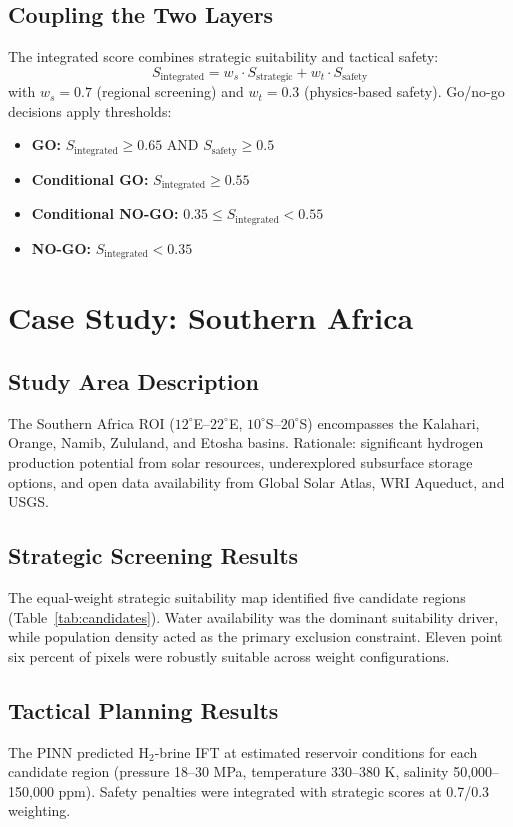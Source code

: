 \documentclass[11pt]{article}
\begin{document}
\subsection{Coupling the Two Layers}
The integrated score combines strategic suitability and tactical safety:
\begin{equation}
S_{\text{integrated}} = w_s \cdot S_{\text{strategic}} + w_t \cdot S_{\text{safety}}
\end{equation}
with $w_s = 0.7$ (regional screening) and $w_t = 0.3$ (physics-based safety). Go/no-go decisions apply thresholds:
\begin{itemize}
    \item \textbf{GO:} $S_{\text{integrated}} \geq 0.65$ AND $S_{\text{safety}} \geq 0.5$
    \item \textbf{Conditional GO:} $S_{\text{integrated}} \geq 0.55$
    \item \textbf{Conditional NO-GO:} $0.35 \leq S_{\text{integrated}} < 0.55$
    \item \textbf{NO-GO:} $S_{\text{integrated}} < 0.35$
\end{itemize}

\section{Case Study: Southern Africa}

\subsection{Study Area Description}
The Southern Africa ROI ($12^\circ$E--$22^\circ$E, $10^\circ$S--$20^\circ$S) encompasses the Kalahari, Orange, Namib, Zululand, and Etosha basins. Rationale: significant hydrogen production potential from solar resources, underexplored subsurface storage options, and open data availability from Global Solar Atlas, WRI Aqueduct, and USGS.

\subsection{Strategic Screening Results}
The equal-weight strategic suitability map identified five candidate regions (Table~\ref{tab:candidates}). Water availability was the dominant suitability driver, while population density acted as the primary exclusion constraint. Eleven point six percent of pixels were robustly suitable across weight configurations.

\subsection{Tactical Planning Results}
The PINN predicted H$_2$-brine IFT at estimated reservoir conditions for each candidate region (pressure 18--30 MPa, temperature 330--380 K, salinity 50,000--150,000 ppm). Safety penalties were integrated with strategic scores at 0.7/0.3 weighting.
\end{document}
